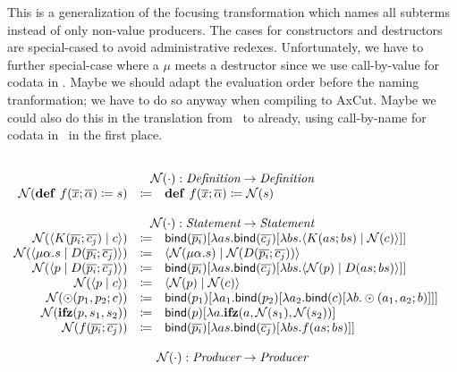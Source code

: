 This is a generalization of the focusing transformation which names all subterms instead of only non-value producers.
The cases for constructors and destructors are special-cased to avoid administrative redexes.
Unfortunately, we have to further special-case where a $\mu$ meets a destructor since we use call-by-value for codata in \targetlang.
Maybe we should adapt the evaluation order before the naming tranformation; we have to do so anyway when compiling to AxCut.
Maybe we could also do this in the translation from \surfacelang\ to \targetlang already, using call-by-name for codata in \targetlang\ in the first place.

\[
  \begin{array}{rcll}
    \\
    \multicolumn{4}{c}{\name{\cdot} : \emph{Definition} \rightarrow \emph{Definition}}\\
    \name{\defi{f(\overline{x}; \overline{\alpha})}{s}} & \coloneq & \defi{f(\overline{x}; \overline{\alpha})}{\name{s}} & \\
    \\
    \multicolumn{4}{c}{\name{\cdot} : \emph{Statement} \rightarrow \emph{Statement}}\\
    \name{\cut{K(\overline{p_i}; \overline{c_j})}{c}} & \coloneq & \bind{\overline{p_i}}{\lambda as.\bind{\overline{c_j}}{\lambda bs.\cut{K(as; bs)}{\name{c}}}} & \\
    \name{\cut{\mu\alpha.s}{D(\overline{p_i}; \overline{c_j})}} & \coloneq & \cut{\name{\mu\alpha.s}}{\name{D(\overline{p_i}; \overline{c_j})}} & \\
    \name{\cut{p}{D(\overline{p_i}; \overline{c_j})}} & \coloneq & \bind{\overline{p_i}}{\lambda as.\bind{\overline{c_j}}{\lambda bs.\cut{\name{p}}{D(as; bs)}}} & \\
    \name{\cut{p}{c}} & \coloneq & \cut{\name{p}}{\name{c}} & \\
    \name{\odot(p_1, p_2; c)}{} & \coloneq & \bind{p_1}{\lambda a_1.\bind{p_2}{\lambda a_2.\bind{c}{\lambda b.\odot(a_1, a_2; b)}}} & \\
    \name{\ifz{p}{s_1}{s_2}}{} & \coloneq & \bind{p}{\lambda a.\ifz{a}{\name{s_1}}{\name{s_2}}} & \\
    \name{f(\overline{p_i}; \overline{c_j})}{} & \coloneq & \bind{\overline{p_i}}{\lambda as.\bind{\overline{c_j}}{\lambda bs.f(as; bs)}} & \\
    \\
    \multicolumn{4}{c}{\name{\cdot} : \emph{Producer} \rightarrow \emph{Producer}}\\

\end{array}\]

